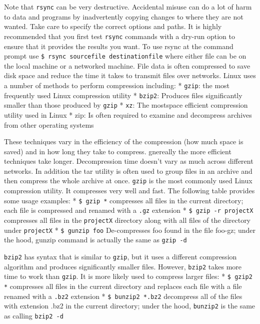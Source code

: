 Note that \texttt{rsync} can be very destructive. Accidental misuse can
do a lot of harm to data and programs by inadvertently copying changes
to where they are not wanted. Take care to specify the correct options
and paths. It is highly recommended that you first test \texttt{rsync}
commands with a dry-run option to ensure that it provides the results
you want. To use rsync at the command prompt use
\texttt{\$ rsync sourcefile destinationfile} where either file can be on
the local machine or a networked machine. File data is often compressed
to save disk space and reduce the time it takes to transmit files over
networks. Linux uses a number of methods to perform compression
including: * \texttt{gzip}: the most frequently used Linux compression
utility * \texttt{bzip2}: Produces files significantly smaller than
those produced by \texttt{gzip} * \texttt{xz}: The mostspace efficient
compression utility used in Linux * zip: Is often required to examine
and decompress archives from other operating systems

These techniques vary in the efficiency of the compression (how much
space is saved) and in how long they take to compress. gnereally the
more efficient techniques take longer. Decompression time doesn't vary
as much across different networks. In addition the tar utility is often
used to group files in an archive and then compress the whole archive at
once. \texttt{gzip} is the most commonly used Linux compression utility.
It compresses very well and fast. The following table provides some
usage examples: * \texttt{\$ gzip *} compresses all files in the current
directory; each file is compressed and renamed with a \texttt{.gz}
extension * \texttt{\$ gzip -r projectX} compresses all files in the
\texttt{projectX} directory along with all files of the directory under
\texttt{projectX} * \texttt{\$ gunzip foo} De-compresses foo found in
the file foo-gz; under the hood, gunzip command is actually the same as
\texttt{gzip -d}

\texttt{bzip2} has syntax that is similar to \texttt{gzip}, but it uses
a different compression algorithm and produces significantly smaller
files. However, \texttt{bzip2} takes more time to work than
\texttt{gzip}. It is more likely used to compress larger files: *
\texttt{\$ gzip2 *} compresses all files in the current directory and
replaces each file with a file renamed with a \texttt{.bz2} extension *
\texttt{\$ bunzip2 *.bz2} decompress all of the files with extension
.bz2 in the current directory; under the hood, \texttt{bunzip2} is the
same as calling \texttt{bzip2 -d}

